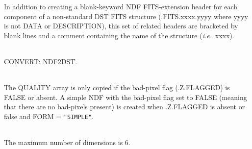 \documentclass[twoside,11pt]{article}
\newcommand{\htmlref}[2]{#1}
\newcommand{\xref}[3]{#1}
\newcommand{\CONVERT}{{\footnotesize CONVERT}}
\newcommand{\sstdiytopic}[2]{\goodbreak \item[{\hspace{-0.35em}#1\hspace{-0.35em}:}] \mbox{} \\[1.3ex] #2}
\newcommand{\sstimplementationstatus}[1]{
   \pagebreak[3] \item[{Implementation Status:}] \mbox{} \\[1.3ex] #1}
\newcommand{\sstdiytopic}[2]{\\ \item[{#1}:]
      \begin{description}
         #2
      \end{description}
   }
\newcommand{\sstimplementationstatus}[1]{\\ \item[Implementation Status:]
      \begin{description}
         #1
      \end{description}
   }
\begin{document}
{{      In addition to creating a blank-keyword NDF FITS-extension
      header for each component of a non-standard DST FITS structure
      (.FITS.xxxx.yyyy where yyyy is not DATA or DESCRIPTION), this set
      of related headers are bracketed by blank lines and a comment
      containing the name of the structure ({\it i.e.}\ xxxx).
   }
   \sstdiytopic{
      Related Applications
   }{
      \CONVERT: \htmlref{NDF2DST}{NDF2DST}.
   }
   \sstdiytopic{
   \xref{Bad-pixel handling}{sun95}{se_masking}
   }{
   The QUALITY array is only copied if the bad-pixel flag
   (.Z.FLAGGED) is FALSE or absent.  A simple NDF with the bad-pixel
   flag set to FALSE (meaning that there are no bad-pixels present)
   is created when .Z.FLAGGED is absent or false and FORM = \texttt{"SIMPLE"}.
   }
   \sstimplementationstatus{
      The maximum number of dimensions is 6.
   }
}
\end{document}
